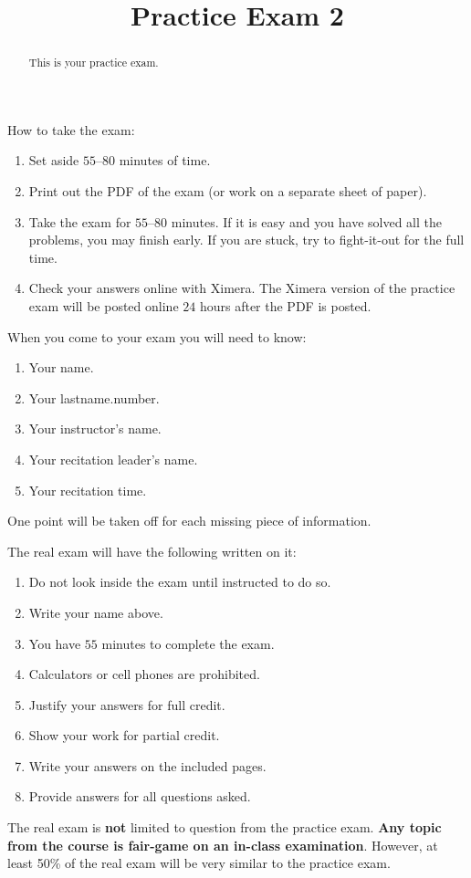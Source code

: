 \documentclass{ximera}
\title{Practice Exam 2}
\begin{document}
\begin{abstract}
This is your practice exam.
\end{abstract}
\maketitle
\thispagestyle{empty}

How to take the exam:
\begin{enumerate}
  \item Set aside $55$--$80$ minutes of time.
  \item Print out the PDF of the exam (or work on a separate sheet of paper).
  \item Take the exam for $55$--$80$ minutes. If it is easy and you have
    solved all the problems, you may finish early. If you are stuck,
    try to fight-it-out for the full time.
  \item Check your answers online with Ximera. The Ximera version of
    the practice exam will be posted online $24$ hours after the PDF is
    posted.
\end{enumerate}


When you come to your exam you will need to know:
\begin{enumerate}
\item Your name.
\item Your lastname.number.
\item Your instructor's name.
\item Your recitation leader's name.
\item Your recitation time.
\end{enumerate}
One point will be taken off for each missing piece of information.

The real exam will have the following written on it:

\begin{enumerate}
\item Do not look inside the exam until instructed to do so.
\item Write your name above.
\item You have $55$ minutes to complete the exam.
\item Calculators or cell phones are prohibited.
\item Justify your answers for full credit.
\item Show your work for partial credit.
\item Write your answers on the included pages.
\item Provide answers for all questions asked.
\end{enumerate}

The real exam is \textbf{not} limited to question from the practice
exam. \textbf{Any topic from the course is fair-game on an in-class
  examination}.  However, at least 50\% of the real exam will be very
similar to the practice exam.
\end{document}
